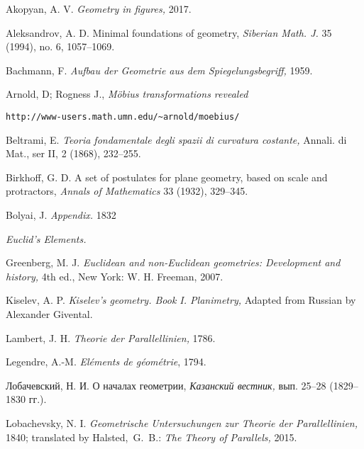 \renewcommand{\bibname}{Used resources}
\begin{thebibliography}{52}

Akopyan, A. V. 
\textit{Geometry in figures,} 2017.


Aleksandrov, A. D.
Minimal foundations of geometry,
\textit{Siberian Math. J.} 35 (1994), no. 6, 1057--1069.

 Bachmann, F.
\textit{Aufbau der Geometrie aus dem Spiegelungsbegriff,} 1959. 

 Arnold, D; Rogness J., \textit{M\"obius transformations revealed}
\begin{verbatim}http://www-users.math.umn.edu/~arnold/moebius/\end{verbatim}


  Beltrami, E.
\textit{Teoria fondamentale degli spazii di curvatura costante,} 
Annali. di Mat., ser II, 2 (1868), 232--255.

Birkhoff, G. D.
A set of postulates for plane geometry,
based on scale and protractors, 
\textit{Annals of Mathematics} 33 (1932), 329--345.

 Bolyai, J. \textit{Appendix.} 1832

\textit{Euclid's Elements.}

Greenberg, M. J.
\textit{Euclidean and non-Euclidean geometries: Development and history,}
4th ed., New York: W. H. Freeman, 2007.

Kiselev, A. P.
\textit{Kiselev's geometry.
Book I. Planimetry,}
Adapted from Russian by Alexander Givental.


Lambert, J. H.
\textit{Theorie der Parallellinien,}
1786.

Legendre, A.-M.
\textit{El\'ements de g\'eom\'etrie}, 1794.

\begin{otherlanguage}{russian}
Лобачевский, Н. И.  
О началах геометрии, 
\textit{Казанский вестник,} вып. 25--28 (1829--1830 гг.).
\end{otherlanguage}

Lobachevsky, N. I.
\textit{Geometrische Untersuchungen zur Theorie der Parallellinien,} 1840;
translated by Halsted,~G.~B.: \textit{The Theory of Parallels,} 2015.




\end{thebibliography}
